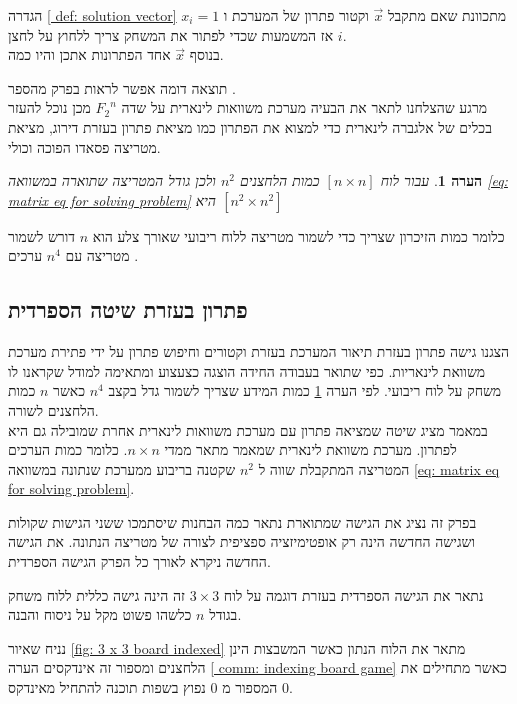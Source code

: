 \documentclass[12pt,twoside]{article}
\newtheorem{comm}{הערה}[section]
\newcommand{\Fn}{{F_2}^n}
\begin{document}
הגדרה 
\ref{ def: solution vector}
מתכוונת שאם מתקבל
$\vec{x}$
וקטור פתרון של המערכת 
ו
$x_i = 1$
אז המשמעות שכדי לפתור את המשחק
צריך ללחוץ על לחצן 
$i$.
\\
בנוסף 
$\vec{x}$
אחד הפתרונות אתכן והיו כמה.


תוצאה דומה אפשר לראות בפרק מהספר
\cite{B2}.
\\
מרגע שהצלחנו לתאר את הבעיה מערכת משוואות לינארית
על שדה
$\Fn$
מכן נוכל להעזר בכלים של אלגברה לינארית כדי למצוא את הפתרון כמו מציאת פתרון בעזרת דירוג,
מציאת מטריצה פסאדו הפוכה וכולי.

\begin{comm}
    \label{comm: for board too many variables}
    עבור לוח 
$[n \times n]$
כמות הלחצנים 
$n^2$
ולכן גודל המטריצה שתוארה במשוואה
\ref{eq: matrix eq for solving problem}
היא 
$[n^2 \times n^2]$
\end{comm}


כלומר כמות הזיכרון שצריך כדי לשמור מטריצה ללוח ריבועי שאורך צלע הוא
$n$
דורש לשמור מטריצה עם 
$n^4$
ערכים
.


\subsection{פתרון בעזרת שיטה הספרדית}
הצגנו גישה פתרון בעזרת תיאור המערכת בעזרת וקטורים וחיפוש פתרון על ידי פתירת מערכת משוואת לינאריות.
כפי שתואר בעבודה 
\cite{B2}
החידה הוצגה כצעצוע ומתאימה למודל שקראנו לו משחק על לוח ריבועי.
לפי הערה 
\ref{comm: for board too many variables}
כמות המידע שצריך לשמור גדל בקצב 
$n^4$
כאשר
$n$
כמות הלחצנים לשורה.
\\
במאמר 
\cite{B1}
מציג שיטה שמציאה פתרון עם מערכת משוואות לינארית אחרת שמובילה גם היא לפתרון.
מערכת משוואת לינארית שמאמר 
\cite{B1}
מתאר ממדי
$n \times n $.
כלומר כמות הערכים המטריצה המתקבלת שווה
ל
$n^2$
שקטנה בריבוע
ממערכת 
שנתונה במשוואה
\ref{eq: matrix eq for solving problem}.

בפרק זה נציג את הגישה שמתוארת 
\cite{B1}
נתאר כמה הבחנות שיסתמכו ששני הגישות שקולות ושגישה החדשה הינה רק אופטימיזציה
ספציפית לצורה של מטריצה הנתונה.
את הגישה החדשה ניקרא לאורך כל הפרק הגישה הספרדית.

נתאר את הגישה הספרדית בעזרת דוגמה על לוח 
$3 \times 3$
זה הינה גישה כללית ללוח משחק בגודל 
$n$
כלשהו פשוט מקל על ניסוח והבנה.

נניח שאיור 
\ref{fig: 3 x 3 board indexed}
מתאר את הלוח הנתון כאשר המשבצות הינן הלחצנים ומספור זה אינדקסים הערה 
\ref{ comm: indexing board game}
כאשר מתחילים את המספור מ
$0$
נפוץ בשפות תוכנה להתחיל מאינדקס 
$0$.
\end{document}
